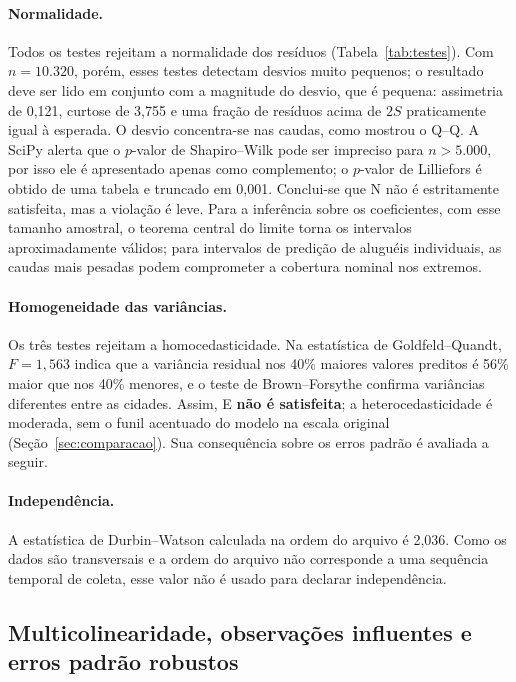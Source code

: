 \documentclass[12pt,a4paper]{article}
\begin{document}
\paragraph{Normalidade.} Todos os testes rejeitam a normalidade dos resíduos (Tabela~\ref{tab:testes}). Com $n=10.320$, porém, esses testes detectam desvios muito pequenos; o resultado deve ser lido em conjunto com a magnitude do desvio, que é pequena: assimetria de 0,121, curtose de 3,755 e uma fração de resíduos acima de $2S$ praticamente igual à esperada. O desvio concentra-se nas caudas, como mostrou o Q--Q. A SciPy alerta que o $p$-valor de Shapiro--Wilk pode ser impreciso para $n>5.000$, por isso ele é apresentado apenas como complemento; o $p$-valor de Lilliefors é obtido de uma tabela e truncado em 0,001. Conclui-se que N não é estritamente satisfeita, mas a violação é leve. Para a inferência sobre os coeficientes, com esse tamanho amostral, o teorema central do limite torna os intervalos aproximadamente válidos; para intervalos de predição de aluguéis individuais, as caudas mais pesadas podem comprometer a cobertura nominal nos extremos.

\paragraph{Homogeneidade das variâncias.} Os três testes rejeitam a homocedasticidade. Na estatística de Goldfeld--Quandt, $F=1{,}563$ indica que a variância residual nos 40\% maiores valores preditos é 56\% maior que nos 40\% menores, e o teste de Brown--Forsythe confirma variâncias diferentes entre as cidades. Assim, E \textbf{não é satisfeita}; a heterocedasticidade é moderada, sem o funil acentuado do modelo na escala original (Seção~\ref{sec:comparacao}). Sua consequência sobre os erros padrão é avaliada a seguir.

\paragraph{Independência.} A estatística de Durbin--Watson calculada na ordem do arquivo é 2,036. Como os dados são transversais e a ordem do arquivo não corresponde a uma sequência temporal de coleta, esse valor não é usado para declarar independência.

\subsection{Multicolinearidade, observações influentes e erros padrão robustos}
\end{document}
